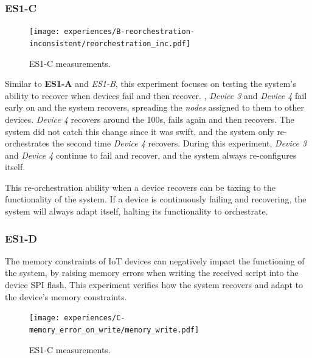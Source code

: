 
\subsubsection{ES1-C}

\begin{figure}[h]
    \centering
    \texttt{[image: experiences/B-reorchestration-inconsistent/reorchestration\_inc.pdf]}
    \caption[ES1-C measurements]{ES1-C measurements.}
    \label{fig:experiment_b_graph}
\end{figure}

Similar to \textbf{ES1-A} and \textit{ES1-B}, this experiment focuses on testing the system's ability to recover when devices fail and then recover. , \textit{Device 3} and \textit{Device 4} fail early on and the system recovers, spreading the \textit{nodes} assigned to them to other devices. \textit{Device 4} recovers around the 100s, fails again and then recovers. The system did not catch this change since it was swift, and the system only re-orchestrates the second time \textit{Device 4} recovers. During this experiment, \textit{Device 3} and \textit{Device 4} continue to fail and recover, and the system always re-configures itself.

This re-orchestration ability when a device recovers can be taxing to the functionality of the system. If a device is continuously failing and recovering, the system will always adapt itself, halting its functionality to orchestrate.


\subsubsection{ES1-D}

The memory constraints of IoT devices can negatively impact the functioning of the system, by raising memory errors when writing the received script into the device SPI flash. This experiment verifies how the system recovers and adapt to the device's memory constraints.

\begin{figure}[h]
\centering
\texttt{[image: experiences/C-memory\_error\_on\_write/memory\_write.pdf]}
\caption[ES1-C measurements]{ES1-C measurements.}\label{fig:experiment_c_graph}
\end{figure}

